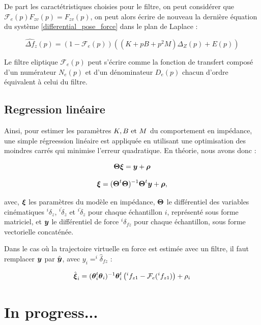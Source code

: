 \documentclass[12pt, a4paper]{article} %
\numberwithin{equation}{section}
\begin{document}
	De part les caractétristiques choisies pour le filtre, on peut considérer que $ \mathcal{F}_e(p) F_{zv}(p) = F_{zv}(p) $, on peut alors écrire de nouveau la dernière équation du système \cref{differential_pose_force} dans le plan de Laplace :
	
	\begin{equation}
		\hat{\Delta f}_z(p) = (1 - \mathcal{F}_e(p)) \left( (K + p B + p^2 M)\Delta_Z(p) + E(p) \right) 
	\end{equation}
	
	Le filtre eliptique $ \mathcal{F}_e(p) $ peut s'écrire comme la fonction de transfert composé d'un numérateur $ N_e(p) $ et d'un dénominateur $ D_e(p) $ chacun d'ordre équivalent à celui du filtre.
	
	\subsection{Regression linéaire}
	
	Ainsi, pour estimer les paramètres $ K, B \textnormal{ et } M $ du comportement en impédance, une simple régreession linéaire est appliquée en utilisant une optimisation des moindres carrés qui minimise l'erreur quadratique. En théorie, nous avons donc :
	
	\begin{equation}
		\matr{\Theta}\vect{\xi} = \vect{y} + \vect{\rho}
	\end{equation}
	
	\begin{equation}
		\vect{\xi} = (\matr{\Theta}^t\matr{\Theta})^{-1} \matr{\Theta}^t \vect{y} + \vect{\rho} \textnormal{,}
	\end{equation}

	avec, $ \vect{\xi} $ les paramètres du modèle en impédance, $ \matr{\Theta} $ le différentiel des variables cinématiques $ ^i\delta_z $, $ ^i\dot{\delta}_z $ et $ ^i\ddot{\delta}_z $ pour chaque échantillon $i$, représenté sous forme matriciel, et $ \vect{y} $ le différentiel de force $ ^i\delta_{fz} $ pour chaque échantillon, sous forme vectorielle concaténée.
	
	Dans le cas où la trajectoire virtuelle en force est estimée avec un filtre, il faut remplacer  $ \vect{y} $ par $ \hat{\vect{y}} $, avec $ y_i = ^i\hat{\delta}_{fz} $ :
	
		
	\begin{equation}
		\hat{\vect{\xi}}_i = (\vect{\theta}_i^t\vect{\theta}_i)^{-1} \vect{\theta}_i^t \left( ^if_{z1} - \mathcal{F}_e(^if_{z1}) \right) + \rho_i 
	\end{equation}

	\section{In progress...}	

	
	\newpage
		
	
\end{document}
